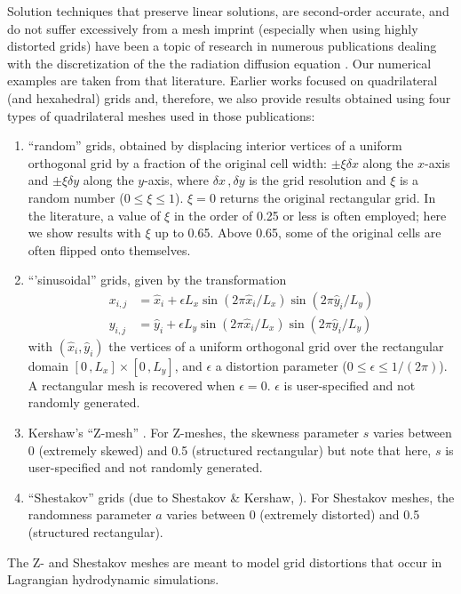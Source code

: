 \documentclass[preprint,10pt]{elsarticle}
\begin{document}
Solution techniques that preserve linear solutions, are 
second-order accurate, and do not suffer excessively from a mesh imprint (especially when using highly
distorted grids) have been a topic of research in numerous publications dealing with the discretization of the
the radiation diffusion equation . Our numerical examples
are taken from that literature. Earlier works focused on quadrilateral (and hexahedral) grids
\cite{Morel1992,MorelRobertsShashkov1998,MorelHallShashkov2001,Palmer2001} and, therefore, 
we also provide results obtained using four types of quadrilateral meshes used in those publications: 
\begin{enumerate}
\item 
``random'' grids, obtained by displacing interior vertices of a uniform orthogonal grid by a fraction
of the original cell width: $\pm\xi\delta x$ along 
the $x$-axis and $\pm\xi\delta y$ along the $y$-axis, where $\delta x\,,\delta y$ is the grid resolution 
and $\xi$ is a random number ($0 \le \xi \le 1$). $\xi=0$ returns the original rectangular grid. In 
the literature, a value of $\xi$ in the order of 0.25 or less is often employed; here we show results with $\xi$ up to 0.65. 
Above 0.65, some of the original cells are often flipped onto themselves. 
\item
 ``'sinusoidal'' grids, given by the transformation
\begin{align*}
x_{i,j} &= \hat x_i + \epsilon L_x \sin\left(2\pi \hat x_i/L_x \right) \sin\left(2\pi \hat y_i/L_y \right) \\
y_{i,j} &= \hat y_i + \epsilon L_y \sin\left(2\pi \hat x_i/L_x \right) \sin\left(2\pi \hat y_i/L_y \right) 
\end{align*}
with $(\hat x_i, \hat y_i)$ the vertices of a uniform orthogonal grid over the rectangular domain 
$[0\, , L_x]\times [0\, , L_y]$, and $\epsilon$ a distortion parameter ($0\le \epsilon \le 1/(2\pi)$). 
A rectangular mesh is recovered when $\epsilon=0$. $\epsilon$ is user-specified and not randomly generated.
\item
Kershaw's ``Z-mesh'' \cite{Kershaw1981}.  
For Z-meshes, the skewness parameter $s$ varies between 0 (extremely skewed) and 0.5 (structured rectangular)
but note that here, $s$ is user-specified and not randomly generated.
\item 
``Shestakov'' grids (due to Shestakov \& Kershaw, \cite{Shestakov1988,Sheshakov1990}).
For Shestakov meshes, the randomness parameter $a$ varies between 0 (extremely distorted) 
and 0.5 (structured rectangular).
\end{enumerate}
The Z- and Shestakov meshes are meant to model grid distortions that occur in Lagrangian hydrodynamic 
simulations. 
\end{document}
